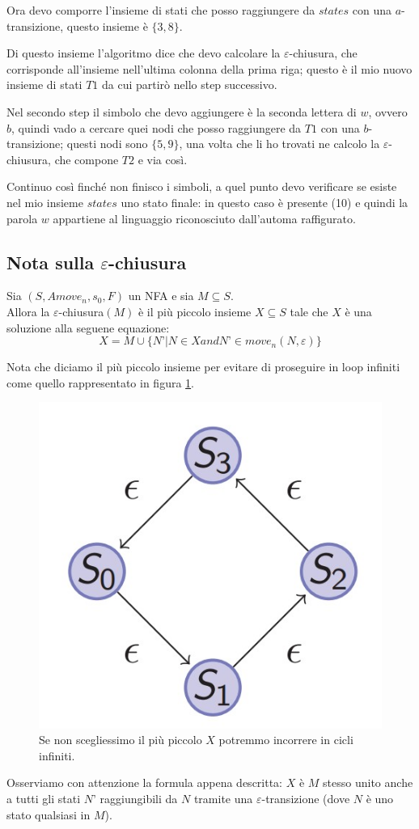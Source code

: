 \documentclass[class=book, crop=false, oneside, 12pt]{standalone}
\begin{document}
Ora devo comporre l’insieme di stati che posso raggiungere da \(states\) con una \(a\)-transizione, questo insieme è \(\{3, 8\}\). 

Di questo insieme l’algoritmo dice che devo calcolare la \(\varepsilon\)-chiusura, che corrisponde all’insieme nell’ultima colonna della prima riga; questo è il mio nuovo insieme di stati \(T1\) da cui partirò nello step successivo.

Nel secondo step il simbolo che devo aggiungere è la seconda lettera di \(w\), ovvero \(b\), quindi vado a cercare quei nodi che posso raggiungere da \(T1\) con una \(b\)-transizione; questi nodi sono \(\{5,9\}\), una volta che li ho trovati ne calcolo la \(\varepsilon\)-chiusura, che compone \(T2\) e via così.

Continuo così finché non finisco i simboli, a quel punto devo verificare se esiste nel mio insieme \(states\) uno stato finale: in questo caso è presente (10) e quindi la parola \(w\) appartiene al linguaggio riconosciuto dall’automa raffigurato.


\subsection{Nota sulla \(\varepsilon\)-chiusura}
\begin{theorem}
    Sia \((S, A move_n, s_0, F)\) un NFA e sia \(M \subseteq S\).\\
    Allora la \(\varepsilon\)-chiusura\((M)\) è il più piccolo insieme \(X \subseteq S\) tale che \(X\) è una soluzione alla seguene equazione:
    \begin{equation}
        X = M \cup \{ N’ | N \in X and N’ \in move_n (N,\varepsilon)\}
    \end{equation}
\end{theorem}
Nota che diciamo il più piccolo insieme per evitare di proseguire in loop infiniti come quello rappresentato in figura \ref{nfa_ciclico}.

\begin{figure}
    \centering
    \includegraphics[width=.3\textwidth,keepaspectratio]{nfa_ciclico}
    \caption{Se non scegliessimo il più piccolo \(X\) potremmo incorrere in cicli infiniti.}
    \label{nfa_ciclico}
\end{figure}
Osserviamo con attenzione la formula appena descritta: \(X\) è \(M\) stesso unito anche a tutti gli stati \(N’\) raggiungibili da \(N\) tramite una \(\varepsilon\)-transizione (dove \(N\) è uno stato qualsiasi in \(M\)).
\end{document}
